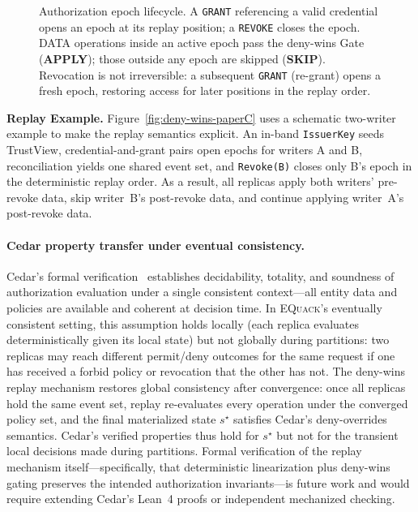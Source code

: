 \documentclass[10pt,journal,compsoc]{IEEEtran}
\newcommand{\equack}{\textsc{EQuack}}
\begin{document}
\begin{figure}[htbp]
\centering
\resizebox{\textwidth}{!}{}
\caption{Authorization epoch lifecycle. A \texttt{GRANT} referencing a valid credential opens an epoch at its replay position; a \texttt{REVOKE} closes the epoch. DATA operations inside an active epoch pass the deny-wins Gate (\textbf{APPLY}); those outside any epoch are skipped (\textbf{SKIP}). Revocation is not irreversible: a subsequent \texttt{GRANT} (re-grant) opens a fresh epoch, restoring access for later positions in the replay order.}
\label{fig:epoch-lifecycle-paperC}
\end{figure}

\textbf{Replay Example.} Figure~\ref{fig:deny-wins-paperC} uses a schematic two-writer example to make the replay semantics explicit. An in-band \texttt{IssuerKey} seeds TrustView, credential-and-grant pairs open epochs for writers A and B, reconciliation yields one shared event set, and \texttt{Revoke(B)} closes only B's epoch in the deterministic replay order. As a result, all replicas apply both writers' pre-revoke data, skip writer~B's post-revoke data, and continue applying writer~A's post-revoke data.

\paragraph{Cedar property transfer under eventual consistency.}
Cedar's formal verification~\cite{cutler2024cedar} establishes decidability, totality, and soundness of authorization evaluation under a single consistent context---all entity data and policies are available and coherent at decision time. In \equack{}'s eventually consistent setting, this assumption holds locally (each replica evaluates deterministically given its local state) but not globally during partitions: two replicas may reach different permit/deny outcomes for the same request if one has received a forbid policy or revocation that the other has not. The deny-wins replay mechanism restores global consistency after convergence: once all replicas hold the same event set, replay re-evaluates every operation under the converged policy set, and the final materialized state $s^\star$ satisfies Cedar's deny-overrides semantics. Cedar's verified properties thus hold for $s^\star$ but not for the transient local decisions made during partitions. Formal verification of the replay mechanism itself---specifically, that deterministic linearization plus deny-wins gating preserves the intended authorization invariants---is future work and would require extending Cedar's Lean~4 proofs or independent mechanized checking.
\end{document}
